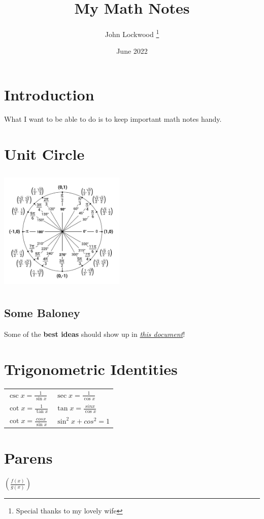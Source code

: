 \documentclass[12pt, letterpaper]{article}
\title{My Math Notes}
\author{John Lockwood \thanks{Special thanks to my lovely wife}}
\date{June 2022}
\newcommand\T{\rule{0pt}{8mm}}       %
\begin{document}
\maketitle

\section{Introduction}

What I want to be able to do is to keep important math notes handy.

\section{Unit Circle}
\includegraphics[width=6cm, height=6cm]{unit-circle.png}

\subsection{Some Baloney}

Some of the \textbf{best ideas} should show up in \underline{\textit{this document}}! 

\section{Trigonometric Identities}

\begin{center}
    \begin{tabular}{  p{5cm}  p{5cm} }
        $\csc x = \frac{1}{\sin x }$ & 
        $\sec x = \frac{1}{\cos x }$ \T \\
        
        $\cot x = \frac{1}{\tan x }$ & 
        $\tan x = \frac{sin x}{\cos x }$ \T \\
        $\cot x = \frac{cos x}{\sin x }$ & 
        $\sin^2 x + cos^2 = 1$ \T \\

\end{tabular}
\end{center}
\vspace{1cm}

\section{Parens}
$(\frac{f(x)}{g(x)})$
\end{document}
